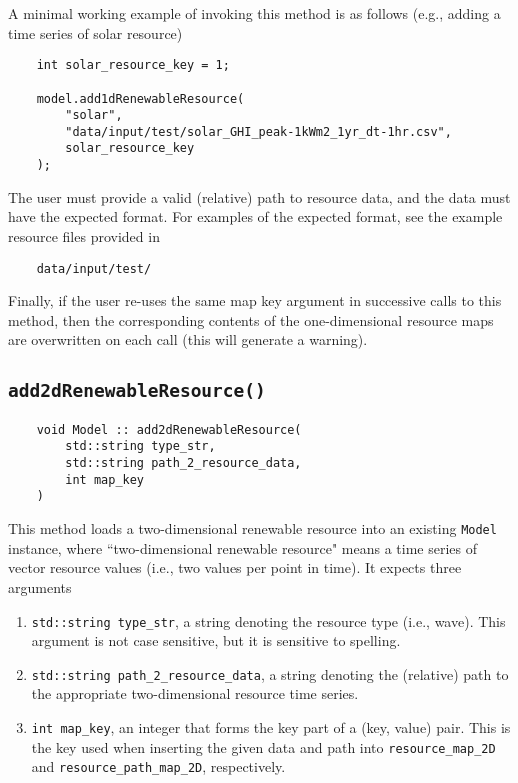 \documentclass[12pt, letterpaper]{report}
\begin{document}
\noindent A minimal working example of invoking this method is as follows (e.g., adding a time series of solar resource)

\begin{verbatim}
    int solar_resource_key = 1;
    
    model.add1dRenewableResource(
        "solar",
        "data/input/test/solar_GHI_peak-1kWm2_1yr_dt-1hr.csv",
        solar_resource_key
    );
\end{verbatim}

\noindent The user must provide a valid (relative) path to resource data, and the data must have the expected format. For examples of the expected format, see the example resource files provided in

\begin{verbatim}
    data/input/test/
\end{verbatim}

\noindent Finally, if the user re-uses the same map key argument in successive calls to this method, then the corresponding contents of the one-dimensional resource maps are overwritten on each call (this will generate a warning).

\subsection{\texttt{add2dRenewableResource(\;\;)}}

\begin{verbatim}
    void Model :: add2dRenewableResource(
        std::string type_str,
        std::string path_2_resource_data,
        int map_key
    )
\end{verbatim}

This method loads a two-dimensional renewable resource into an existing \texttt{Model} instance, where ``two-dimensional renewable resource" means a time series of vector resource values (i.e., two values per point in time). It expects three arguments

\begin{enumerate}
    \item \texttt{std::string type\_str}, a string denoting the resource type (i.e., wave). This argument is not case sensitive, but it is sensitive to spelling.
    \item \texttt{std::string path\_2\_resource\_data}, a string denoting the (relative) path to the appropriate two-dimensional resource time series.
    \item \texttt{int map\_key}, an integer that forms the key part of a (key, value) pair. This is the key used when inserting the given data and path into \texttt{resource\_map\_2D} and \texttt{resource\_path\_map\_2D}, respectively.
\end{enumerate}
\end{document}
